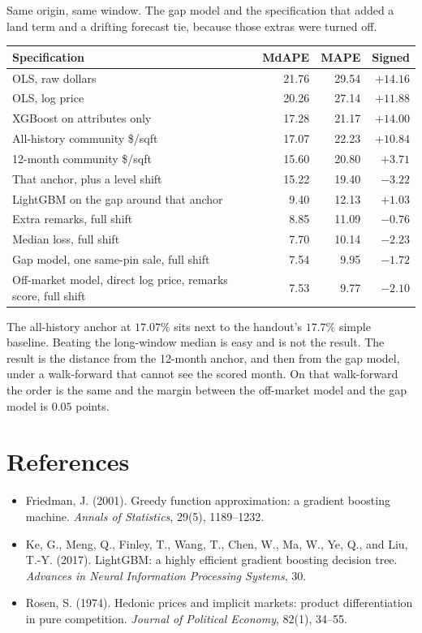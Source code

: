 \documentclass[11pt]{article}
\begin{document}
Same origin, same window. The gap model and the specification that added a land term and a drifting forecast tie, because those extras were turned off.

\begin{center}
\small
\begin{tabular}{p{9.6cm}rrr}
\toprule
Specification & MdAPE & MAPE & Signed \\
\midrule
OLS, raw dollars & 21.76 & 29.54 & \(+14.16\) \\
OLS, log price & 20.26 & 27.14 & \(+11.88\) \\
XGBoost on attributes only & 17.28 & 21.17 & \(+14.00\) \\
All-history community \$/sqft & 17.07 & 22.23 & \(+10.84\) \\
12-month community \$/sqft & 15.60 & 20.80 & \(+3.71\) \\
That anchor, plus a level shift & 15.22 & 19.40 & \(-3.22\) \\
LightGBM on the gap around that anchor & 9.40 & 12.13 & \(+1.03\) \\
Extra remarks, full shift & 8.85 & 11.09 & \(-0.76\) \\
Median loss, full shift & 7.70 & 10.14 & \(-2.23\) \\
Gap model, one same-pin sale, full shift & 7.54 & 9.95 & \(-1.72\) \\
Off-market model, direct log price, remarks score, full shift & 7.53 & 9.77 & \(-2.10\) \\
\bottomrule
\end{tabular}
\end{center}

The all-history anchor at \(17.07\%\) sits next to the handout's \(17.7\%\) simple baseline. Beating the long-window median is easy and is not the result. The result is the distance from the 12-month anchor, and then from the gap model, under a walk-forward that cannot see the scored month. On that walk-forward the order is the same and the margin between the off-market model and the gap model is \(0.05\) points.

\section{References}

\begin{itemize}
\item Friedman, J. (2001). Greedy function approximation: a gradient boosting machine. \emph{Annals of Statistics}, 29(5), 1189--1232.
\item Ke, G., Meng, Q., Finley, T., Wang, T., Chen, W., Ma, W., Ye, Q., and Liu, T.-Y. (2017). LightGBM: a highly efficient gradient boosting decision tree. \emph{Advances in Neural Information Processing Systems}, 30.
\item Rosen, S. (1974). Hedonic prices and implicit markets: product differentiation in pure competition. \emph{Journal of Political Economy}, 82(1), 34--55.
\end{itemize}
\end{document}
